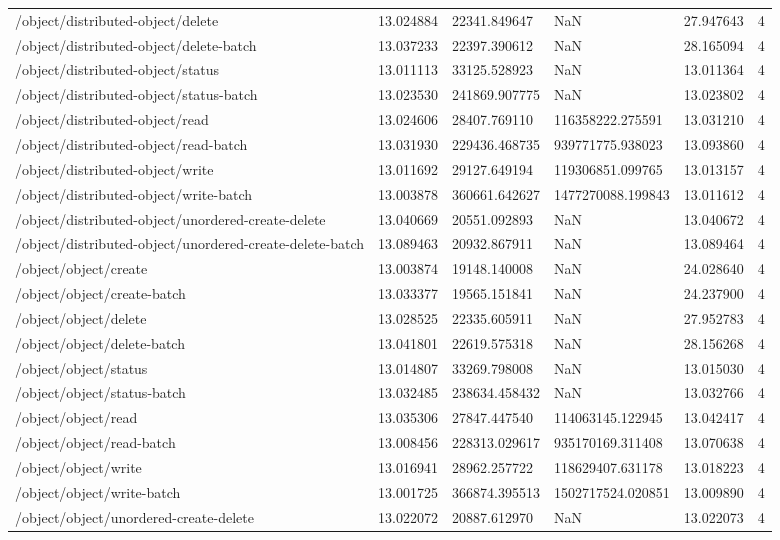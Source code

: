 \begin{tabularx}{\linewidth}{XXXXXX}
/object/distributed-object/delete & 13.024884 & 22341.849647 & NaN & 27.947643 & 4 \\
/object/distributed-object/delete-batch & 13.037233 & 22397.390612 & NaN & 28.165094 & 4 \\
/object/distributed-object/status & 13.011113 & 33125.528923 & NaN & 13.011364 & 4 \\
/object/distributed-object/status-batch & 13.023530 & 241869.907775 & NaN & 13.023802 & 4 \\
/object/distributed-object/read & 13.024606 & 28407.769110 & 116358222.275591 & 13.031210 & 4 \\
/object/distributed-object/read-batch & 13.031930 & 229436.468735 & 939771775.938023 & 13.093860 & 4 \\
/object/distributed-object/write & 13.011692 & 29127.649194 & 119306851.099765 & 13.013157 & 4 \\
/object/distributed-object/write-batch & 13.003878 & 360661.642627 & 1477270088.199843 & 13.011612 & 4 \\
/object/distributed-object/unordered-create-delete & 13.040669 & 20551.092893 & NaN & 13.040672 & 4 \\
/object/distributed-object/unordered-create-delete-batch & 13.089463 & 20932.867911 & NaN & 13.089464 & 4 \\
/object/object/create & 13.003874 & 19148.140008 & NaN & 24.028640 & 4 \\
/object/object/create-batch & 13.033377 & 19565.151841 & NaN & 24.237900 & 4 \\
/object/object/delete & 13.028525 & 22335.605911 & NaN & 27.952783 & 4 \\
/object/object/delete-batch & 13.041801 & 22619.575318 & NaN & 28.156268 & 4 \\
/object/object/status & 13.014807 & 33269.798008 & NaN & 13.015030 & 4 \\
/object/object/status-batch & 13.032485 & 238634.458432 & NaN & 13.032766 & 4 \\
/object/object/read & 13.035306 & 27847.447540 & 114063145.122945 & 13.042417 & 4 \\
/object/object/read-batch & 13.008456 & 228313.029617 & 935170169.311408 & 13.070638 & 4 \\
/object/object/write & 13.016941 & 28962.257722 & 118629407.631178 & 13.018223 & 4 \\
/object/object/write-batch & 13.001725 & 366874.395513 & 1502717524.020851 & 13.009890 & 4 \\
/object/object/unordered-create-delete & 13.022072 & 20887.612970 & NaN & 13.022073 & 4 \\

\end{tabularx}
